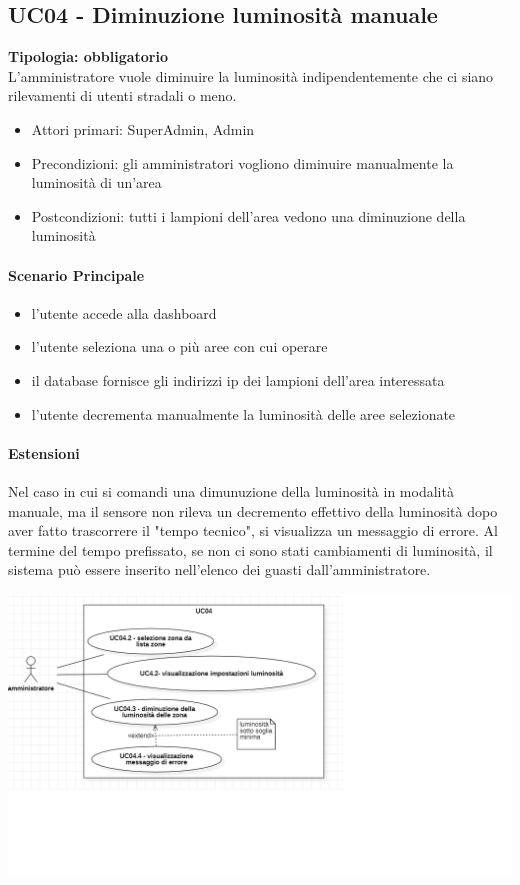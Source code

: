 \documentclass[12pt]{article}
\begin{document}
\subsection{UC04 - Diminuzione luminosità manuale}
\textbf{Tipologia: obbligatorio} \\
L'amministratore vuole diminuire la luminosità indipendentemente che ci siano rilevamenti di utenti stradali o meno.
\begin{itemize}
	\item Attori primari: SuperAdmin, Admin
	\item Precondizioni: gli amministratori vogliono diminuire manualmente la luminosità di un'area
	\item Postcondizioni: tutti i lampioni dell'area vedono una diminuzione della luminosità
\end{itemize}
\paragraph{Scenario Principale}
\begin{itemize}
	\item l'utente accede alla dashboard
	\item l'utente seleziona una o più aree con cui operare
 	\item il database fornisce gli indirizzi ip dei lampioni dell'area interessata
	\item l'utente decrementa manualmente la luminosità delle aree selezionate
\end{itemize}
\paragraph{Estensioni} Nel caso in cui si comandi una dimunuzione della luminosità in modalità manuale, ma il sensore non rileva un decremento effettivo della luminosità dopo aver fatto trascorrere il "tempo tecnico", si visualizza un messaggio di errore.
Al termine del tempo prefissato, se non ci sono stati cambiamenti di luminosità, il sistema può essere inserito nell'elenco dei guasti dall'amministratore.

\includegraphics[scale=0.5]{UC04.png}
\end{document}
